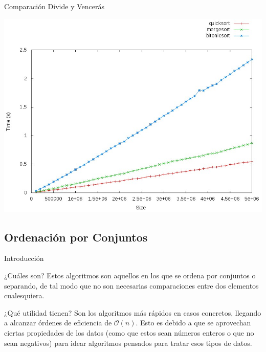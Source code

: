 \documentclass[compress]{beamer}
\begin{document}
\begin{frame}{Comparación Divide y Vencerás}
	\begin{alertblock}{}
		\begin{center}
		\includegraphics[scale=0.40]{images/quic-merg-bito.jpeg}
		\end{center}
	\end{alertblock}
\end{frame}

\subsection{Ordenación por Conjuntos}

\begin{frame}{Introducción}
	\begin{block}{¿Cuáles son?}
	Estos algoritmos son aquellos en los que se ordena por conjuntos o separando, de tal modo que no son necesarias comparaciones entre dos elementos cualesquiera.
	\end{block}
\vspace{0.20in}
	\begin{block}{¿Qué utilidad tienen?}
	Son los algoritmos más rápidos en casos concretos, llegando a alcanzar órdenes de eficiencia de $\mathcal{O}(n)$. Esto es debido a que se aprovechan ciertas propiedades de los datos (como que estos sean números enteros o que no sean negativos) para idear algoritmos pensados para tratar esos tipos de datos.
	\end{block}
\end{frame}
\end{document}
